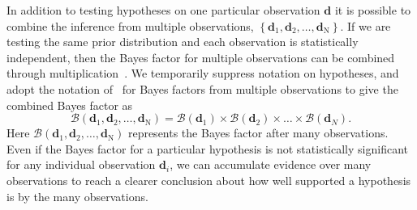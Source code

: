 In addition to testing hypotheses on one particular observation $\mathbf{d}$ it is possible to combine the inference from multiple observations, $\left\{\mathbf{d}_1, \mathbf{d}_2, \ldots, \mathbf{d}_\mathrm{N}\right\}$. If we are testing the same prior distribution and each observation is statistically independent, then the Bayes factor for multiple observations can be combined through multiplication~\cite{read2006encyclopedia, del2013demonstrating}. We temporarily suppress notation on hypotheses, and adopt the notation of~\cite{ly2018replication} for Bayes factors from multiple observations to give the combined Bayes factor as
\begin{equation}\label{eqn:multi_bayes_factors}
   \mathcal{B}(\mathbf{d}_1, \mathbf{d}_2, \ldots, \mathbf{d}_{\mathrm{N}}) = \mathcal{B}(\mathbf{d}_1) \times \mathcal{B}(\mathbf{d}_2) \times \ldots \times \mathcal{B}(\mathbf{d}_N). 
\end{equation}
Here $\mathcal{B}(\mathbf{d}_1, \mathbf{d}_2, \ldots, \mathbf{d}_{\mathrm{N}})$ represents the Bayes factor after many observations. Even if the Bayes factor for a particular hypothesis is not statistically significant for any individual observation $\mathbf{d}_i$, we can accumulate evidence over many observations to reach a clearer conclusion about how well supported a hypothesis is by the many observations.

